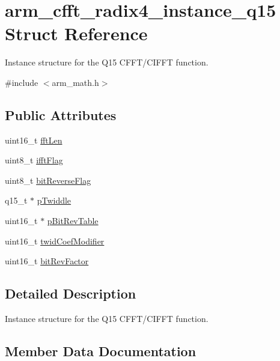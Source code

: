 \hypertarget{structarm__cfft__radix4__instance__q15}{}\section{arm\+\_\+cfft\+\_\+radix4\+\_\+instance\+\_\+q15 Struct Reference}
\label{structarm__cfft__radix4__instance__q15}


Instance structure for the Q15 C\+F\+F\+T/\+C\+I\+F\+FT function.  




{\ttfamily \#include $<$arm\+\_\+math.\+h$>$}

\subsection*{Public Attributes}
\begin{DoxyCompactItemize}
\item 
uint16\+\_\+t \hyperlink{structarm__cfft__radix4__instance__q15_a5fc543e7d84ca8cb7cf6648970f21ca6}{fft\+Len}
\item 
uint8\+\_\+t \hyperlink{structarm__cfft__radix4__instance__q15_a2ecff6ea735cb4d22e922d0fd5736655}{ifft\+Flag}
\item 
uint8\+\_\+t \hyperlink{structarm__cfft__radix4__instance__q15_a101e3f7b0bd6b5b14cd5214f23df4133}{bit\+Reverse\+Flag}
\item 
q15\+\_\+t $\ast$ \hyperlink{structarm__cfft__radix4__instance__q15_a29dd693537e45421a36891f8439e1fba}{p\+Twiddle}
\item 
uint16\+\_\+t $\ast$ \hyperlink{structarm__cfft__radix4__instance__q15_a4acf704ae0cf30b53bf0fbfae8e34a59}{p\+Bit\+Rev\+Table}
\item 
uint16\+\_\+t \hyperlink{structarm__cfft__radix4__instance__q15_af32fdc78bcc27ca385f9b76a0a1f71c3}{twid\+Coef\+Modifier}
\item 
uint16\+\_\+t \hyperlink{structarm__cfft__radix4__instance__q15_a6b010e5f02d1130c621e3d2e26b95df1}{bit\+Rev\+Factor}
\end{DoxyCompactItemize}


\subsection{Detailed Description}
Instance structure for the Q15 C\+F\+F\+T/\+C\+I\+F\+FT function. 

\subsection{Member Data Documentation}

